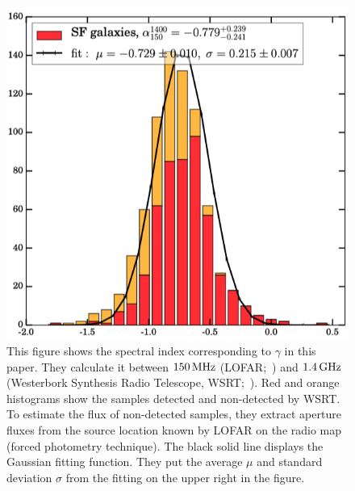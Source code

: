 \begin{figure}[htbp]
	\centering
	\includegraphics[width=.7\linewidth]{Chapter_6/Figures/CalistroRivera2017_Figure7.png}
    \caption[Adapted from \citet{CalistroRivera2017a}]{\label{fig:CalistroRivera2017_figure7}
        This figure shows the spectral index corresponding to $\gamma$ in this paper.
        They calculate it between $150\,\mathrm{MHz}$ (LOFAR;~\citealt{Williams2016}) and $1.4\,\mathrm{GHz}$ (Westerbork Synthesis Radio Telescope, WSRT;~\citealt{DeVries2002}).
        Red and orange histograms show the samples detected and non-detected by WSRT\@.
        To estimate the flux of non-detected samples, they extract aperture fluxes from the source location known by LOFAR on the radio map (forced photometry technique).
        The black solid line displays the Gaussian fitting function.
        They put the average $\mu$ and standard deviation $\sigma$ from the fitting on the upper right in the figure.
    }
\end{figure}


